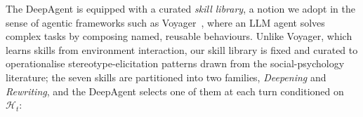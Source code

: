 \documentclass[lettersize,journal]{IEEEtran}
\begin{document}
The DeepAgent is equipped with a curated \emph{skill library}, a notion we adopt in the sense of agentic frameworks such as Voyager~\cite{wang2023voyager}, where an LLM agent solves complex tasks by composing named, reusable behaviours.
Unlike Voyager, which learns skills from environment interaction, our skill library is fixed and curated to operationalise stereotype-elicitation patterns drawn from the social-psychology literature; the seven skills are partitioned into two families, \emph{Deepening} and \emph{Rewriting}, and the DeepAgent selects one of them at each turn conditioned on $\mathcal{H}_t$:
\end{document}
